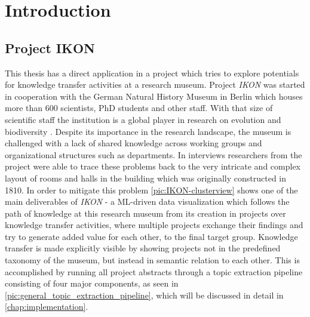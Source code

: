 %
\chapter{Introduction}
\label{chap:introduction}

\section{Project IKON}

This thesis has a direct application in a project which tries to explore potentials for knowledge transfer activities at a research museum. Project \textit{IKON} was started in cooperation with the German Natural History Museum in Berlin which houses more than 600  scientists, PhD students and other staff. With that size of scientific staff the institution is a global player in research on evolution and biodiversity \cite{IntroducingMuseumFur}. Despite its importance in the research landscape, the museum is challenged with a lack of shared knowledge across working groups and organizational structures such as departments. In interviews researchers from the project were able to trace these problems back to the very intricate and complex layout of rooms and halls in the building which was originally constructed in 1810. In order to mitigate this problem \autoref{pic:IKON-clusterview} shows one of the main deliverables of \textit{IKON} - a ML-driven data visualization which follows the path of knowledge at this research museum from its creation in projects over knowledge transfer activities, where multiple projects exchange their findings and try to generate added value for each other, to the final target group. Knowledge transfer is made explicitly visible by showing projects not in the predefined taxonomy of the museum, but instead in semantic relation to each other. This is accomplished by running all project abstracts through a topic extraction pipeline consisting of four major components, as seen in \autoref{pic:general_topic_extraction_pipeline}, which will be discussed in detail in \autoref{chap:implementation}.  

